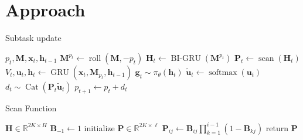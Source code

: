 \documentclass{article}
\DeclareMathOperator{\GRU}{GRU}
\DeclareMathOperator{\BIGRU}{BI-GRU}
\DeclareMathOperator{\Cat}{Cat}
\DeclareMathOperator{\roll}{roll}
\DeclareMathOperator{\scan}{scan}
\DeclareMathOperator{\softmax}{softmax}
\begin{document}
\section{Approach}
\begin{algorithm}[b]
  \caption{Subtask update}
  \label{algo}
  \begin{algorithmic}[1]
     $p_t, \mathbf{M} , \mathbf{x}_t, \mathbf{h}_{t-1}$
    \STATE $\mathbf{M}^{p_t} \gets \roll\left(\mathbf{M}, -p_t\right)$
    \STATE ${\mathbf{H}_t} \gets \BIGRU\left(\mathbf{M}^{p_t}\right)$
    \STATE ${\mathbf{P}_t \gets \scan\left(\mathbf{H}_t\right)}$
    \STATE $V_t, \mathbf{u}_t, \mathbf{h}_t  \gets \GRU\left(\mathbf{x}_t, \mathbf{M}_{p_t}, \mathbf{h}_{t-1}\right)$
    \STATE $\mathbf{g}_{t} \sim \pi_\theta\left(\mathbf{h}_t\right)$
    \STATE $\tilde{\mathbf{u}}_{t} \gets \softmax\left(\mathbf{u}_t\right)$
    \STATE $d_{t} \sim \Cat\left(\mathbf{P}_t\tilde{\mathbf{u}}_t\right)$ 
    \STATE $p_{t + 1} \gets p_t + d_t$
  \end{algorithmic}
\end{algorithm}
\begin{algorithm}[b]
  \caption{Scan Function}
  \label{scan}
  \begin{algorithmic}[1]
$\mathbf{H} \in \mathbb{R}^{2K \times H}$ 
\STATE $\mathbf{B}_{-1} \gets 1$  
\STATE initialize $\mathbf{P} \in \mathbb{R}^{2K \times \ell}$
\STATE $\mathbf{P}_{ij} \gets \mathbf{B}_{ij}\prod_{k=1}^{i-1}\left(1 -
\mathbf{B}_{kj}\right)$
\ENDFOR
\ENDFOR
\STATE return $\mathbf{P}$
  \end{algorithmic}
\end{algorithm}
\end{document}
